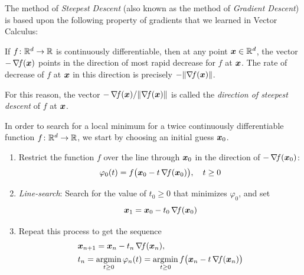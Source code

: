 The method of \emph{Steepest Descent} (also known as the method of \emph{Gradient Descent}) is based upon the following property of gradients that we learned in Vector Calculus:

\begin{theorem}
If $f \colon \mathbb{R}^d \to \mathbb{R}$ is continuously differentiable, then at any point $\boldsymbol{x} \in \mathbb{R}^d$, the vector $-\mathop{\nabla\! {f}}(\boldsymbol{x})$ points in the direction of most rapid decrease for $f$ at $\boldsymbol{x}$.  The rate of decrease of $f$ at $\boldsymbol{x}$ in this direction is precisely $-\lVert \mathop{\nabla\! {f}}(\boldsymbol{x}) \rVert$.
\end{theorem}

\begin{remark}
For this reason, the vector $-\mathop{\nabla\! {f}}(\boldsymbol{x})/\lVert \mathop{\nabla\! {f}}(\boldsymbol{x}) \rVert$ is called the \emph{direction of steepest descent} of $f$ at $\boldsymbol{x}$.
\end{remark}

\separator

In order to search for a local minimum for a twice continuously differentiable function $f\colon \mathbb{R}^d \to \mathbb{R}$, we start by choosing an initial guess $\boldsymbol{x}_0$.  
\begin{enumerate}
	\item Restrict the function $f$ over the line through $\boldsymbol{x}_0$ in the direction of $-\mathop{\nabla\! {f}}(\boldsymbol{x}_0)$:
	\begin{equation*}
	\varphi_0(t) = f\big( \boldsymbol{x}_0 - t \mathop{\nabla\! {f}}(\boldsymbol{x}_0) \big), \quad t\geq 0
	\end{equation*}
	\item \emph{Line-search}: Search for the value of $t_0 \geq 0$ that minimizes $\varphi_0$, and set
	\begin{equation*}
	\boldsymbol{x}_1 = \boldsymbol{x}_0 - t_0\mathop{\nabla\! {f}}(\boldsymbol{x}_0)
	\end{equation*}
	\item Repeat this process to get the sequence
	\begin{gather}\label{equation:SteepestDescent}
	\begin{split}
	&\boldsymbol{x}_{n+1} = \boldsymbol{x}_n - t_n \mathop{\nabla\! {f}}(\boldsymbol{x}_n), \\ &t_n = \operatorname*{argmin}_{t\geq 0} \varphi_n(t) = \operatorname*{argmin}_{t\geq 0} f\big(\boldsymbol{x}_n - t\mathop{\nabla\! {f}}(\boldsymbol{x}_n)\big)
	\end{split}
	\end{gather}
\end{enumerate}

